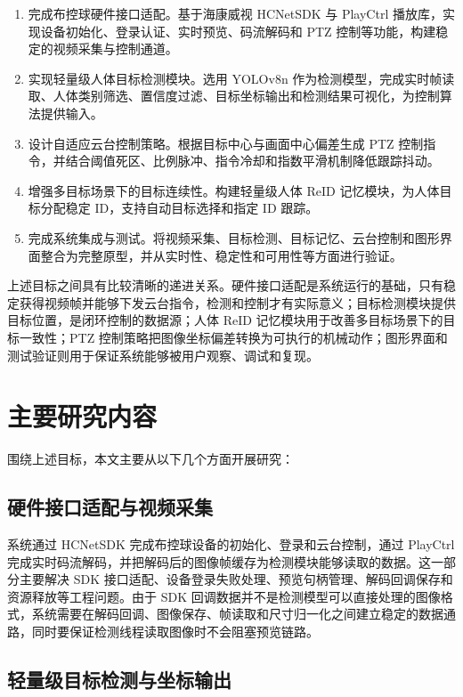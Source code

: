 \begin{enumerate}
    \item 完成布控球硬件接口适配。基于海康威视 HCNetSDK 与 PlayCtrl 播放库，实现设备初始化、登录认证、实时预览、码流解码和 PTZ 控制等功能，构建稳定的视频采集与控制通道。
    \item 实现轻量级人体目标检测模块。选用 YOLOv8n 作为检测模型，完成实时帧读取、人体类别筛选、置信度过滤、目标坐标输出和检测结果可视化，为控制算法提供输入。
    \item 设计自适应云台控制策略。根据目标中心与画面中心偏差生成 PTZ 控制指令，并结合阈值死区、比例脉冲、指令冷却和指数平滑机制降低跟踪抖动。
    \item 增强多目标场景下的目标连续性。构建轻量级人体 ReID 记忆模块，为人体目标分配稳定 ID，支持自动目标选择和指定 ID 跟踪。
    \item 完成系统集成与测试。将视频采集、目标检测、目标记忆、云台控制和图形界面整合为完整原型，并从实时性、稳定性和可用性等方面进行验证。
\end{enumerate}

上述目标之间具有比较清晰的递进关系。硬件接口适配是系统运行的基础，只有稳定获得视频帧并能够下发云台指令，检测和控制才有实际意义；目标检测模块提供目标位置，是闭环控制的数据源；人体 ReID 记忆模块用于改善多目标场景下的目标一致性；PTZ 控制策略把图像坐标偏差转换为可执行的机械动作；图形界面和测试验证则用于保证系统能够被用户观察、调试和复现。

\section{主要研究内容}

围绕上述目标，本文主要从以下几个方面开展研究：

\subsection{硬件接口适配与视频采集}

系统通过 HCNetSDK 完成布控球设备的初始化、登录和云台控制，通过 PlayCtrl 完成实时码流解码，并把解码后的图像帧缓存为检测模块能够读取的数据。这一部分主要解决 SDK 接口适配、设备登录失败处理、预览句柄管理、解码回调保存和资源释放等工程问题。由于 SDK 回调数据并不是检测模型可以直接处理的图像格式，系统需要在解码回调、图像保存、帧读取和尺寸归一化之间建立稳定的数据通路，同时要保证检测线程读取图像时不会阻塞预览链路。

\subsection{轻量级目标检测与坐标输出}

